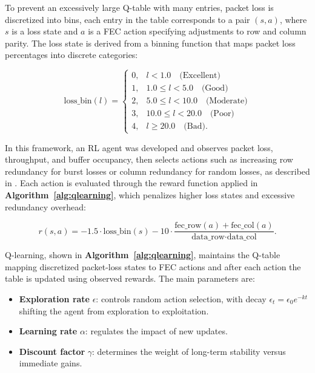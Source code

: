 \quad To prevent an excessively large Q-table with many entries, packet loss is discretized into bins, each entry in the table corresponds to a pair $(s,a)$, where $s$ is a loss state and $a$ is a FEC action specifying adjustments to row and column parity. The loss state is derived from a binning function that maps packet loss percentages into discrete categories:  

\begin{equation}
	\text{loss\_bin}(l) = 
	\begin{cases}
		0, & l < 1.0 \quad \text{(Excellent)} \\
		1, & 1.0 \leq l < 5.0 \quad \text{(Good)} \\
		2, & 5.0 \leq l < 10.0 \quad \text{(Moderate)} \\
		3, & 10.0 \leq l < 20.0 \quad \text{(Poor)} \\
		4, & l \geq 20.0 \quad \text{(Bad)}.
	\end{cases}
\end{equation}

\quad In this framework, an RL agent was developed and observes packet loss, throughput, and buffer occupancy, then selects actions such as increasing row redundancy for burst losses or column redundancy for random losses, as described in \textbf{}. Each action is evaluated through the reward function applied in \textbf{Algorithm~\ref{alg:qlearning}}, which penalizes higher loss states and excessive redundancy overhead:  

\begin{equation}
	r(s,a) = -1.5 \cdot \text{loss\_bin}(s) 
	- 10 \cdot \frac{\text{fec\_row}(a) + \text{fec\_col}(a)}
	{\text{data\_row} \cdot \text{data\_col}}.
\end{equation}

\quad Q-learning, shown in \textbf{Algorithm~\ref{alg:qlearning}}, maintains the Q-table mapping discretized packet-loss states to FEC actions and after each action the table is updated using observed rewards. The main parameters are:  

\begin{itemize}
	\item \textbf{Exploration rate} $\epsilon$: controls random action selection, with decay $\epsilon_t = \epsilon_0 e^{-kt}$ shifting the agent from exploration to exploitation.  
	\item \textbf{Learning rate} $\alpha$: regulates the impact of new updates.  
	\item \textbf{Discount factor} $\gamma$: determines the weight of long-term stability versus immediate gains.  
\end{itemize}


